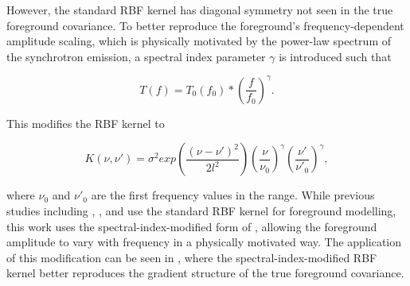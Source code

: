 However, the standard RBF kernel has diagonal symmetry not seen in the true foreground covariance. To better reproduce the foreground's frequency-dependent amplitude scaling, which is physically motivated by the power-law spectrum of the synchrotron emission, a spectral index parameter $\gamma$ is introduced such that 



\begin{equation*}
    T(f) = T_0(f_0) * (\frac{f}{f_0}) ^ \gamma.
\end{equation*}

This modifies the RBF kernel to

\begin{equation}
    \label{eq:RBF_sp_indx}
    K(\nu, \nu') = \sigma^2 exp(\frac{(\nu - \nu')^2}{2l^2})(\frac{\nu}{\nu_0})^\gamma(\frac{\nu'}{\nu'_0})^\gamma,
\end{equation}

where $\nu_0$ and $\nu'_0$ are the first frequency values in the range. While previous studies including \cite{kernGaussianProcessForeground2020}, \cite{mertensImprovedUpperLimits2020}, and \cite{soaresGaussianProcessRegression2022} use the standard RBF kernel for foreground modelling, this work uses the spectral-index-modified form of , allowing the foreground amplitude to vary with frequency in a physically motivated way. The application of this modification can be seen in , where the spectral-index-modified RBF kernel better reproduces the gradient structure of the true foreground covariance.

